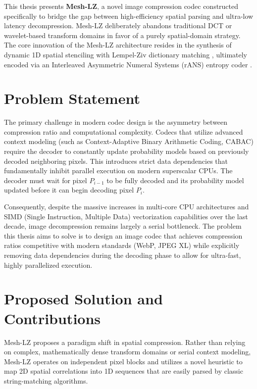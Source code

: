 This thesis presents \textbf{Mesh-LZ}, a novel image compression codec constructed specifically to bridge the gap between high-efficiency spatial parsing and ultra-low latency decompression. Mesh-LZ deliberately abandons traditional DCT or wavelet-based transform domains in favor of a purely spatial-domain strategy. The core innovation of the Mesh-LZ architecture resides in the synthesis of dynamic 1D spatial stenciling with Lempel-Ziv dictionary matching \cite{ziv1977universal}, ultimately encoded via an Interleaved Asymmetric Numeral Systems (rANS) entropy coder \cite{duda2013asymmetric}.

\section{Problem Statement}

The primary challenge in modern codec design is the asymmetry between compression ratio and computational complexity. Codecs that utilize advanced context modeling (such as Context-Adaptive Binary Arithmetic Coding, CABAC) require the decoder to constantly update probability models based on previously decoded neighboring pixels. This introduces strict data dependencies that fundamentally inhibit parallel execution on modern superscalar CPUs. The decoder must wait for pixel $P_{i-1}$ to be fully decoded and its probability model updated before it can begin decoding pixel $P_i$. 

Consequently, despite the massive increases in multi-core CPU architectures and SIMD (Single Instruction, Multiple Data) vectorization capabilities over the last decade, image decompression remains largely a serial bottleneck. The problem this thesis aims to solve is to design an image codec that achieves compression ratios competitive with modern standards (WebP, JPEG XL) while explicitly removing data dependencies during the decoding phase to allow for ultra-fast, highly parallelized execution.

\section{Proposed Solution and Contributions}

Mesh-LZ proposes a paradigm shift in spatial compression. Rather than relying on complex, mathematically dense transform domains or serial context modeling, Mesh-LZ operates on independent pixel blocks and utilizes a novel heuristic to map 2D spatial correlations into 1D sequences that are easily parsed by classic string-matching algorithms.

